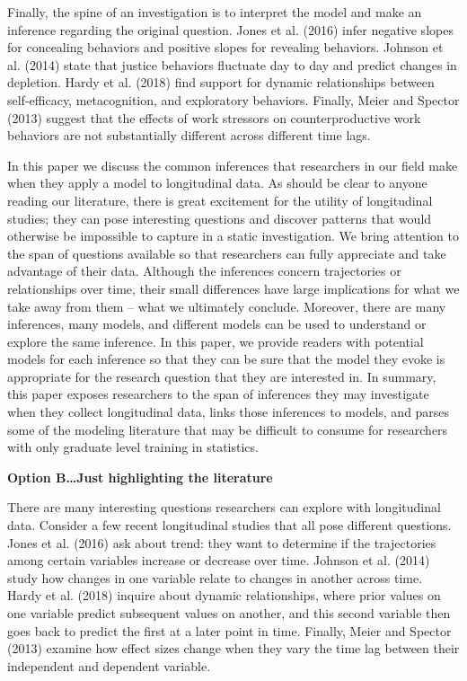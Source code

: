 \documentclass[english,,man]{apa6}
\theoremstyle{definition}
\theoremstyle{definition}
\theoremstyle{definition}
\theoremstyle{remark}
\begin{document}
Finally, the spine of an investigation is to interpret the model and
make an inference regarding the original question. Jones et al. (2016)
infer negative slopes for concealing behaviors and positive slopes for
revealing behaviors. Johnson et al. (2014) state that justice behaviors
fluctuate day to day and predict changes in depletion. Hardy et al.
(2018) find support for dynamic relationships between self-efficacy,
metacognition, and exploratory behaviors. Finally, Meier and Spector
(2013) suggest that the effects of work stressors on counterproductive
work behaviors are not substantially different across different time
lags.

In this paper we discuss the common inferences that researchers in our
field make when they apply a model to longitudinal data. As should be
clear to anyone reading our literature, there is great excitement for
the utility of longitudinal studies; they can pose interesting questions
and discover patterns that would otherwise be impossible to capture in a
static investigation. We bring attention to the span of questions
available so that researchers can fully appreciate and take advantage of
their data. Although the inferences concern trajectories or
relationships over time, their small differences have large implications
for what we take away from them -- what we ultimately conclude.
Moreover, there are many inferences, many models, and different models
can be used to understand or explore the same inference. In this paper,
we provide readers with potential models for each inference so that they
can be sure that the model they evoke is appropriate for the research
question that they are interested in. In summary, this paper exposes
researchers to the span of inferences they may investigate when they
collect longitudinal data, links those inferences to models, and parses
some of the modeling literature that may be difficult to consume for
researchers with only graduate level training in statistics.

\textbf{Option B\ldots{}Just highlighting the literature}

There are many interesting questions researchers can explore with
longitudinal data. Consider a few recent longitudinal studies that all
pose different questions. Jones et al. (2016) ask about trend: they want
to determine if the trajectories among certain variables increase or
decrease over time. Johnson et al. (2014) study how changes in one
variable relate to changes in another across time. Hardy et al. (2018)
inquire about dynamic relationships, where prior values on one variable
predict subsequent values on another, and this second variable then goes
back to predict the first at a later point in time. Finally, Meier and
Spector (2013) examine how effect sizes change when they vary the time
lag between their independent and dependent variable.
\end{document}
